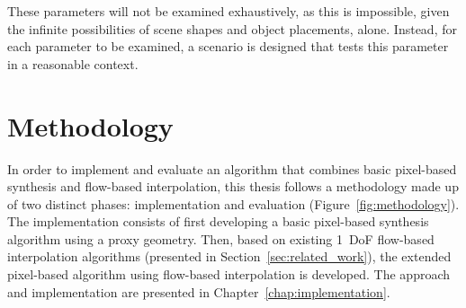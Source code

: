 These parameters will not be examined exhaustively, as this is impossible, given the infinite possibilities of scene shapes and object placements, alone. Instead, for each parameter to be examined, a scenario is designed that tests this parameter in a reasonable context.


%
%
%
%

\section*{Methodology}
In order to implement and evaluate an algorithm that combines basic pixel-based synthesis and flow-based interpolation, this thesis follows a methodology made up of two distinct phases: implementation and evaluation (Figure~\ref{fig:methodology}). The implementation consists of first developing a basic pixel-based synthesis algorithm using a proxy geometry. Then, based on existing 1~DoF flow-based interpolation algorithms (presented in Section~\ref{sec:related_work}), the extended pixel-based algorithm using flow-based interpolation is developed. The approach and implementation are presented in Chapter~\ref{chap:implementation}.

